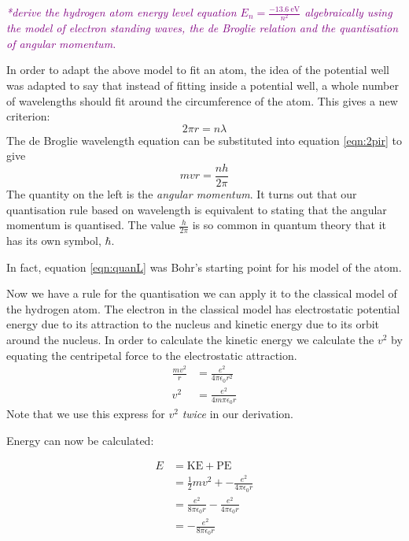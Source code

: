 \documentclass[revision-guide.tex]{subfiles}
\renewcommand{\spec}[1]{\refstepcounter{spec}\Needspace{5\baselineskip}\textcolor{purple}{\textit{#1}}}
\begin{document}
\spec{*derive the hydrogen atom energy level equation
$E_n = \frac{\SI{-13.6}{\electronvolt}}{n^2}$ algebraically using the model of electron standing waves, the de Broglie relation and the quantisation of angular momentum.
}

In order to adapt the above model to fit an atom, the idea of the potential well was adapted to say that instead of fitting inside a potential well, a whole number of wavelengths should fit around the circumference of the atom. This gives a new criterion:
\begin{equation}\label{eqn:2pir}
  2\pi r = n\lambda
\end{equation}
The de Broglie wavelength equation can be substituted into equation \ref{eqn:2pir} to give
\begin{equation}\label{eqn:quanL}
  mvr = \frac{nh}{2\pi}
\end{equation}
The quantity on the left is the \emph{angular momentum}. It turns out that our quantisation rule based on wavelength is equivalent to stating that the angular momentum is quantised. The value $\frac{h}{2\pi}$ is so common in quantum theory that it has its own symbol, $\hbar$.

In fact, equation \ref{eqn:quanL} was Bohr's starting point for his model of the atom.

Now we have a rule for the quantisation we can apply it to the classical model of the hydrogen atom. The electron in the classical model has electrostatic potential energy due to its attraction to the nucleus and kinetic energy due to its orbit around the nucleus. In order to calculate the kinetic energy we calculate the $v^2$ by equating the centripetal force to the electrostatic attraction.
\begin{align}
\frac{mv^2}{r} &= \frac{e^2}{4\pi\epsilon_0 r^2} \nonumber \\
v^2 &= \frac{e^2}{4m\pi\epsilon_0 r}\label{eqn:v2}
\end{align}
Note that we use this express for $v^2$ \emph{twice} in our derivation.

Energy can now be calculated:

\begin{align}
  E &= \text{KE} + \text{PE}\nonumber \\
  &= \frac{1}{2}mv^2 + -\frac{e^2}{4\pi\epsilon_0 r}\label{eqn:e1}\\
  &= \frac{e^2}{8\pi\epsilon_0 r} - \frac{e^2}{4\pi\epsilon_0 r} \nonumber \\
  &= -\frac{e^2}{8\pi\epsilon_0 r}\label{eqn:e}
\end{align}
\end{document}
